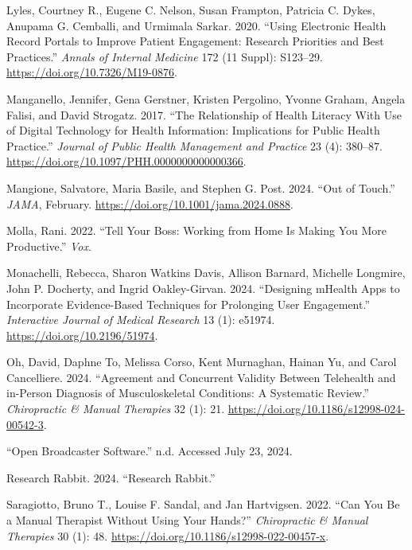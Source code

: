 \documentclass[
  letterpaper,
]{article}
\newlength{\cslhangindent}
\newenvironment{CSLReferences}[2] %
 {\begin{list}{}{%
  \setlength{\itemindent}{0pt}
  \setlength{\leftmargin}{0pt}
  \setlength{\parsep}{0pt}
  \ifodd #1
   \setlength{\leftmargin}{\cslhangindent}
   \setlength{\itemindent}{-1\cslhangindent}
  \fi
  \setlength{\itemsep}{#2\baselineskip}}}
 {\end{list}}
\begin{document}
\begin{CSLReferences}{1}{0}
Lyles, Courtney R., Eugene C. Nelson, Susan Frampton, Patricia C. Dykes,
Anupama G. Cemballi, and Urmimala Sarkar. 2020. {``Using {Electronic
Health Record Portals} to {Improve Patient Engagement}: {Research
Priorities} and {Best Practices}.''} \emph{Annals of Internal Medicine}
172 (11 Suppl): S123--29. \url{https://doi.org/10.7326/M19-0876}.

Manganello, Jennifer, Gena Gerstner, Kristen Pergolino, Yvonne Graham,
Angela Falisi, and David Strogatz. 2017. {``The {Relationship} of
{Health Literacy With Use} of {Digital Technology} for {Health
Information}: {Implications} for {Public Health Practice}.''}
\emph{Journal of Public Health Management and Practice} 23 (4): 380--87.
\url{https://doi.org/10.1097/PHH.0000000000000366}.

Mangione, Salvatore, Maria Basile, and Stephen G. Post. 2024. {``Out of
{Touch}.''} \emph{JAMA}, February.
\url{https://doi.org/10.1001/jama.2024.0888}.

Molla, Rani. 2022. {``Tell Your Boss: {Working} from Home Is Making You
More Productive.''} \emph{Vox}.

Monachelli, Rebecca, Sharon Watkins Davis, Allison Barnard, Michelle
Longmire, John P. Docherty, and Ingrid Oakley-Girvan. 2024. {``Designing
{mHealth Apps} to {Incorporate Evidence-Based Techniques} for
{Prolonging User Engagement}.''} \emph{Interactive Journal of Medical
Research} 13 (1): e51974. \url{https://doi.org/10.2196/51974}.

Oh, David, Daphne To, Melissa Corso, Kent Murnaghan, Hainan Yu, and
Carol Cancelliere. 2024. {``Agreement and Concurrent Validity Between
Telehealth and in-Person Diagnosis of Musculoskeletal Conditions: A
Systematic Review.''} \emph{Chiropractic \& Manual Therapies} 32 (1):
21. \url{https://doi.org/10.1186/s12998-024-00542-3}.

{``Open {Broadcaster Software}.''} n.d. Accessed July 23, 2024.

Research Rabbit. 2024. {``Research {Rabbit}.''}

Saragiotto, Bruno T., Louise F. Sandal, and Jan Hartvigsen. 2022. {``Can
You Be a Manual Therapist Without Using Your Hands?''}
\emph{Chiropractic \& Manual Therapies} 30 (1): 48.
\url{https://doi.org/10.1186/s12998-022-00457-x}.


\end{CSLReferences}
\end{document}
